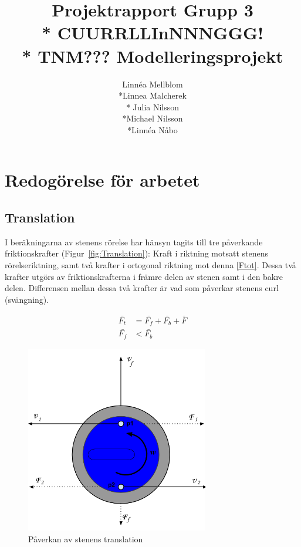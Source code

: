 \documentclass[11pt]{article} %
\title{Projektrapport Grupp 3 \\* 
CUURRLLInNNNGGG!\\*
TNM??? Modelleringsprojekt}
\author{Linnéa Mellblom\\*Linnea Malcherek\\* Julia Nilsson\\*Michael Nilsson\\*Linnéa Nåbo}
\begin{document}
\maketitle
\pagebreak
{}  

\section{Redogörelse för arbetet}

\subsection{Translation}

I beräkningarna av stenens rörelse har hänsyn tagits till tre påverkande friktionskrafter (Figur~\ref{fig:Translation}): Kraft i riktning motsatt stenens rörelseriktning, samt två krafter i ortogonal riktning mot denna \eqref{Ftot}. Dessa två krafter utgörs av friktionskrafterna i främre delen av stenen samt i den bakre delen. Differensen mellan dessa två krafter är vad som påverkar stenens curl (svängning). 

 \begin{align}\label{Ftot}
 \bar{F_t}&=\bar{F_f}+\bar{F_b}+\bar{F}\\
 \bar{F_f}&<\bar{F_b}
 \end{align}


\begin{figure}[ht!]
\centering
\includegraphics[width=80mm]{Translation.png}
\caption{Påverkan av stenens translation}
\label{fig:Translation}
\label{overflow}
\end{figure}
\end{document}
